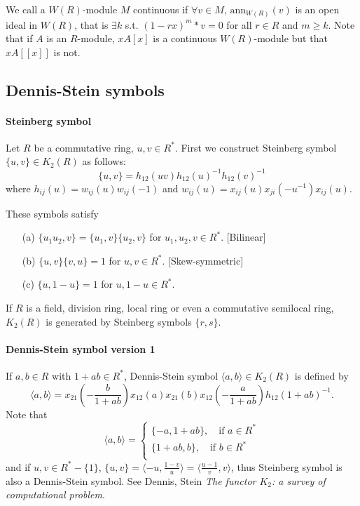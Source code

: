 We call a $W(R)$-module $M$ continuous if $\forall v \in M$, $\textrm{ann}_{W(R)}(v)$ is an open ideal in $W(R)$, that is $\exists k$ s.t. $(1-rx)^m *v =0$ for all $r\in R$ and $m\geqslant k$. Note that if $A$ is an $R$-module, $xA[x]$ is a continuous $W(R)$-module but that $xA[[x]]$ is not.

\subsection{Dennis-Stein symbols} %
\label{sub:dennis_stein_symbols}
\paragraph{Steinberg symbol} %
\label{par:steinberg_symbol}


Let $R$ be a commutative ring, $u,v\in R^*$. First we construct Steinberg symbol $\{u,v\}\in K_2(R)$ as follows:
\[\{u,v\}=h_{12}(uv)h_{12}(u)^{-1}h_12(v)^{-1}\]
where $h_{ij}(u)=w_{ij}(u)w_{ij}(-1)$ and $w_{ij}(u)=x_{ij}(u)x_{ji}(-u^{-1})x_{ij}(u)$.

These symbols satisfy
\begin{itemize}
	\item[(a)] $\{u_1u_2,v\}=\{u_1,v\}\{u_2,v\}$ for $u_1,u_2,v\in R^*$. [Bilinear]\\
	\item[(b)] $\{u,v\}\{v,u\}=1$ for $u,v \in R^*$. [Skew-symmetric]\\
	\item[(c)] $\{u,1-u\}=1$ for $u,1-u\in R^*$.
\end{itemize}
\begin{theorem}
	If $R$ is a field, division ring, local ring or even a commutative semilocal ring, $K_2(R)$ is generated by Steinberg symbols $\{r,s\}$.
\end{theorem}
\paragraph{Dennis-Stein symbol {\color{green}version 1}} %
\label{par:dennis_stein_symbol_greenversion_1}
If $a,b\in R$ with $1+ab \in R^*$, Dennis-Stein symbol $\langle a,b \rangle \in K_2(R)$ is defined by 
\[\langle a,b \rangle = x_{21}(-\frac{b}{1+ab})x_{12}(a)x_{21}(b)x_{12}(-\frac{a}{1+ab})h_{12}(1+ab)^{-1}.\]
Note that 
\[\langle a,b \rangle = \begin{cases}
	\{-a,1+ab\},\quad \mbox{if $a\in R^*$}\\
	\{1+ab,b\},\quad \mbox{if $b\in R^*$}\\
\end{cases}\]
and if $u,v\in R^*-\{1\}$, $\{u,v\}=\langle -u, \frac{1-v}{u} \rangle = \langle \frac{u-1}{v},v\rangle$, thus Steinberg symbol is also a Dennis-Stein symbol. See Dennis, Stein \emph{The functor $K_2$: a survey of computational problem}.

